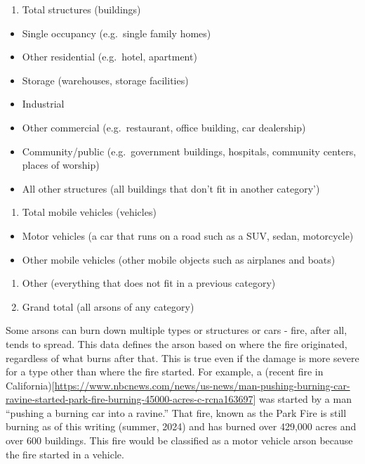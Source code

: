 \documentclass[
  12pt,
  openany]{book}
\providecommand{\tightlist}{%
  \setlength{\itemsep}{0pt}\setlength{\parskip}{0pt}}
\begin{document}
\begin{enumerate}
\def\labelenumi{\arabic{enumi}.}
\tightlist
\item
  Total structures (buildings)
\end{enumerate}

\begin{itemize}
\tightlist
\item
  Single occupancy (e.g.~single family homes)
\item
  Other residential (e.g.~hotel, apartment)
\item
  Storage (warehouses, storage facilities)
\item
  Industrial
\item
  Other commercial (e.g.~restaurant, office building, car dealership)
\item
  Community/public (e.g.~government buildings, hospitals, community centers, places of worship)
\item
  All other structures (all buildings that don't fit in another category')
\end{itemize}

\begin{enumerate}
\def\labelenumi{\arabic{enumi}.}
\setcounter{enumi}{1}
\tightlist
\item
  Total mobile vehicles (vehicles)
\end{enumerate}

\begin{itemize}
\tightlist
\item
  Motor vehicles (a car that runs on a road such as a SUV, sedan, motorcycle)
\item
  Other mobile vehicles (other mobile objects such as airplanes and boats)
\end{itemize}

\begin{enumerate}
\def\labelenumi{\arabic{enumi}.}
\setcounter{enumi}{2}
\tightlist
\item
  Other (everything that does not fit in a previous category)
\item
  Grand total (all arsons of any category)
\end{enumerate}

Some arsons can burn down multiple types or structures or cars - fire, after all, tends to spread. This data defines the arson based on where the fire originated, regardless of what burns after that. This is true even if the damage is more severe for a type other than where the fire started. For example, a (recent fire in California){[}\url{https://www.nbcnews.com/news/us-news/man-pushing-burning-car-ravine-started-park-fire-burning-45000-acres-c-rcna163697}{]} was started by a man ``pushing a burning car into a ravine.'' That fire, known as the Park Fire is still burning as of this writing (summer, 2024) and has burned over 429,000 acres and over 600 buildings. This fire would be classified as a motor vehicle arson because the fire started in a vehicle.
\end{document}
